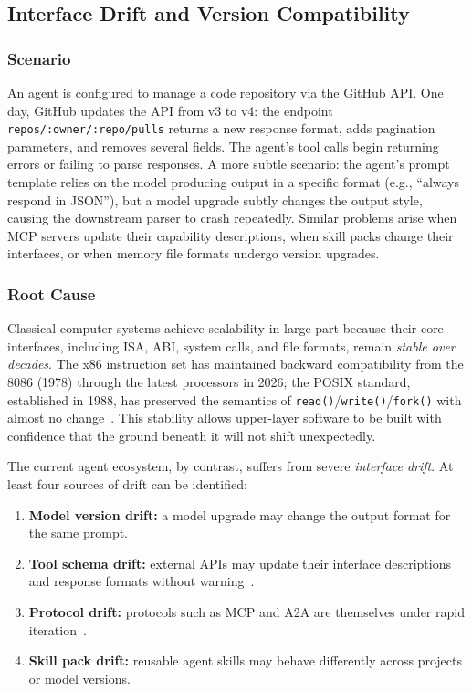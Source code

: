 

\subsection{Interface Drift and Version Compatibility}

\subsubsection{Scenario}
An agent is configured to manage a code repository via the GitHub API.
One day, GitHub updates the API from v3 to v4: the endpoint \texttt{repos/:owner/:repo/pulls} returns a new response format, adds pagination parameters, and removes several fields.
The agent's tool calls begin returning errors or failing to parse responses.
A more subtle scenario: the agent's prompt template relies on the model producing output in a specific format (e.g., ``always respond in JSON''), but a model upgrade subtly changes the output style, causing the downstream parser to crash repeatedly.
Similar problems arise when MCP servers update their capability descriptions, when skill packs change their interfaces, or when memory file formats undergo version upgrades.

\subsubsection{Root Cause}
Classical computer systems achieve scalability in large part because their core interfaces, including ISA, ABI, system calls, and file formats, remain \emph{stable over decades}.
The x86 instruction set has maintained backward compatibility from the 8086 (1978) through the latest processors in 2026; the POSIX standard, established in 1988, has preserved the semantics of \texttt{read()}/\texttt{write()}/\texttt{fork()} with almost no change~\cite{ostep_2023}.
This stability allows upper-layer software to be built with confidence that the ground beneath it will not shift unexpectedly.

The current agent ecosystem, by contrast, suffers from severe \emph{interface drift}.
At least four sources of drift can be identified:
\begin{enumerate}[nosep]
\item \textbf{Model version drift:} a model upgrade may change the output format for the same prompt.
\item \textbf{Tool schema drift:} external APIs may update their interface descriptions and response formats without warning~\cite{mcp_intro_2026}.
\item \textbf{Protocol drift:} protocols such as MCP and A2A are themselves under rapid iteration~\cite{agentprotocols2025,google_a2a_2025}.
\item \textbf{Skill pack drift:} reusable agent skills may behave differently across projects or model versions.
\end{enumerate}


